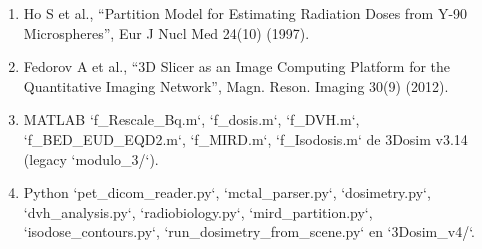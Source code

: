\documentclass[12pt,a4paper]{article}
\begin{document}
\begin{enumerate}
  \item Ho S et al., ``Partition Model for Estimating Radiation Doses from Y-90 Microspheres'', Eur J Nucl Med 24(10) (1997).
  \item Fedorov A et al., ``3D Slicer as an Image Computing Platform for the Quantitative Imaging Network'', Magn. Reson. Imaging 30(9) (2012).
  \item MATLAB `f\_Rescale\_Bq.m`, `f\_dosis.m`, `f\_DVH.m`, `f\_BED\_EUD\_EQD2.m`, `f\_MIRD.m`, `f\_Isodosis.m` de 3Dosim v3.14 (legacy `modulo\_3/`).
  \item Python `pet\_dicom\_reader.py`, `mctal\_parser.py`, `dosimetry.py`, `dvh\_analysis.py`, `radiobiology.py`, `mird\_partition.py`, `isodose\_contours.py`, `run\_dosimetry\_from\_scene.py` en `3Dosim\_v4/`.
\end{enumerate}
\end{document}
